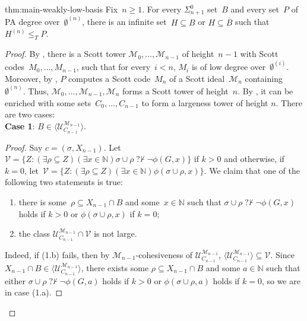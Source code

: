 \documentclass{article}
\def\NN{\mathbb{N}}
\def\PP{\mathbb{P}}
\def\U{\mathcal{U}}
\def\V{\mathcal{V}}
\def\M{\mathcal{M}}
\def\PP{\mathbb{P}}
\newcommand{\nqvdash}{\operatorname{{?}{\nvdash}}}
\numberwithin{theorem}{section}
\newtheorem{lemma}[theorem]{Lemma}
\theoremstyle{definition}
\begin{document}
\begin{repmaintheorem}{thm:main-weakly-low-basis}
Fix~$n \geq 1$. For every $\Sigma^0_{n+1}$ set~$B$ and every set~$P$ of PA degree over~$\emptyset^{(n)}$, there is an infinite set~$H \subseteq B$ or $H \subseteq \overline{B}$ such that $H^{(n)} \leq_T P$.
\end{repmaintheorem}
\begin{proof}
By , there is a Scott tower $\M_0, \dots, \M_{n-1}$ of height~$n-1$ with Scott codes~$M_0, \dots, M_{n-1}$, such that for every~$i < n$, $M_i$ is of low degree over~$\emptyset^{(i)}$.
Moreover, by , $P$ computes a Scott code~$M_n$ of a Scott ideal~$\M_n$ containing~$\emptyset^{(n)}$. Thus, $\M_0, \dots, \M_{n-1}, \M_n$ forms a Scott tower of height~$n$.
By , it can be enriched with some sets~$C_0, \dots, C_{n-1}$ to form a largeness tower of height $n$. There are two cases: \\

\textbf{Case 1}: $B \in \langle \U_{C_{n-1}}^{\M_{n-1}} \rangle$. 


\begin{proof}
Say $c = (\sigma, X_{n-1})$.
Let~$\V = \{Z : (\exists \rho \subseteq Z)(\exists x \in \NN) \sigma \cup \rho \nqvdash \neg \phi(G,x)\}$ if $k > 0$ and otherwise, if $k = 0$, let~$\V = \{Z : (\exists \rho \subseteq Z)(\exists x \in \NN) \phi(\sigma \cup \rho,x)\}$.
We claim that one of the following two statements is true:
\begin{enumerate}
    \item[(1.a)] there is some~$\rho \subseteq X_{n-1} \cap B$ and some~$x \in \NN$ such that $\sigma \cup \rho \nqvdash \neg \phi(G,x)$ holds if $k > 0$ or $\phi(\sigma \cup \rho,x)$ if $k = 0$;
    \item[(1.b)] the class $\U_{C_{n-1}}^{\M_{n-1}} \cap \V$ is not large.
\end{enumerate}
Indeed, if (1.b) fails, then by $\M_{n-1}$-cohesiveness of $\U_{C_{n-1}}^{\M_{n-1}}$, $\langle \U_{C_{n-1}}^{\M_{n-1}} \rangle \subseteq \V$. Since $X_{n-1} \cap B \in \langle \U_{C_{n-1}}^{\M_{n-1}} \rangle$, there exists some $\rho \subseteq X_{n-1} \cap B$ and some $a \in \NN$ such that either $\sigma \cup \rho \nqvdash \neg \phi(G,a)$ holds if $k > 0$ or $\phi(\sigma \cup \rho,a)$ holds if $k = 0$, so we are in case (1.a).


\end{proof}
\end{proof}
\end{document}
